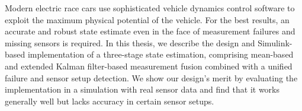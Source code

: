 Modern electric race cars use sophisticated vehicle dynamics control software to exploit the maximum physical potential of the vehicle. For the best results, an accurate and robust state estimate even in the face of measurement failures and missing sensors is required. In this thesis, we describe the design and Simulink-based implementation of a three-stage state estimation, comprising mean-based and extended Kalman filter-based measurement fusion combined with a unified failure and sensor setup detection. We show our design's merit by evaluating the implementation in a simulation with real sensor data and find that it works generally well but lacks accuracy in certain sensor setups.
